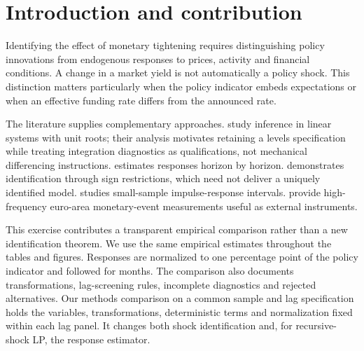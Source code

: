 \begin{abstract}
We compare monetary-response methods on a common euro-area sample with fixed lag orders three and seven. Recursive and sign-restricted VARs, recursive-shock local projections and proxy VARs use identical variables, transformations and shock normalization within each panel. At twelve months, proxy euro appreciation is \PThreeFXPoint{} and \PSevenFXPoint{} log percent respectively, with conditional bands excluding zero. Proxy price estimates are \PThreePricePoint{} and \PSevenPricePoint{}, both imprecise. Türkiye's recursive price estimate is \TRPricePoint{}, also imprecise. Exogeneity is assumed, proxy uncertainty conditions on fitted slopes, and slightly unstable dynamics limit causal interpretation.
\end{abstract}
\section{Introduction and contribution}
Identifying the effect of monetary tightening requires distinguishing policy innovations from endogenous responses to prices, activity and financial conditions. A change in a market yield is not automatically a policy shock. This distinction matters particularly when the policy indicator embeds expectations or when an effective funding rate differs from the announced rate.

The literature supplies complementary approaches. \citet{ssw} study inference in linear systems with unit roots; their analysis motivates retaining a levels specification while treating integration diagnostics as qualifications, not mechanical differencing instructions. \citet{jorda} estimates responses horizon by horizon. \citet{uhlig} demonstrates identification through sign restrictions, which need not deliver a uniquely identified model. \citet{kilian} studies small-sample impulse-response intervals. \citet{altavilla} provide high-frequency euro-area monetary-event measurements useful as external instruments.

This exercise contributes a transparent empirical comparison rather than a new identification theorem. We use the same empirical estimates throughout the tables and figures. Responses are normalized to one percentage point of the policy indicator and followed for \Horizon{} months. The comparison also documents transformations, lag-screening rules, incomplete diagnostics and rejected alternatives. Our methods comparison on a common sample and lag specification holds the variables, transformations, deterministic terms and normalization fixed within each lag panel. It changes both shock identification and, for recursive-shock LP, the response estimator.
